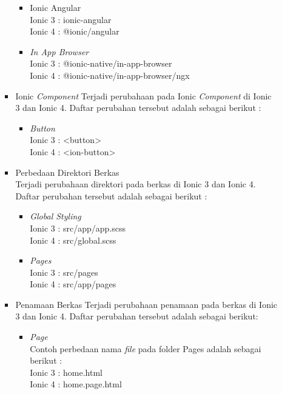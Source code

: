 \begin{enumerate}
\begin{enumerate}
\begin{itemize}
\begin{itemize}
				\item Ionic Angular \\
				Ionic 3 : ionic-angular  \\
				Ionic 4 : @ionic/angular
	
				\item {\it In App Browser} \\
				Ionic 3 : @ionic-native/in-app-browser \\
				Ionic 4 : @ionic-native/in-app-browser/ngx
			\end{itemize}
	
			\item Ionic {\it Component}
			Terjadi perubahaan pada Ionic {\it Component} di Ionic 3 dan Ionic 4. Daftar perubahan tersebut adalah sebagai berikut :
			\begin{itemize}
				\item {\it Button} \\
				Ionic 3 : <button>  \\
				Ionic 4 : <ion-button>
			\end{itemize}
	
			\item Perbedaan Direktori Berkas \\
			Terjadi perubahaan direktori pada berkas di Ionic 3 dan Ionic 4. Daftar perubahan tersebut adalah sebagai berikut :
			\begin{itemize}
				\item {\it Global Styling} \\
				Ionic 3 : src/app/app.scss \\
				Ionic 4 : src/global.scss

				\item {\it Pages} \\
				Ionic 3 : src/pages  \\
				Ionic 4 : src/app/pages
			\end{itemize}
	
			\item Penamaan Berkas
			Terjadi perubahaan penamaan pada berkas di Ionic 3 dan Ionic 4. Daftar perubahan tersebut adalah sebagai berikut:
			\begin{itemize}
				\item {\it Page} \\
				Contoh perbedaan nama {\it file} pada folder Pages adalah sebagai berikut :\\
				Ionic 3 : home.html  \\
				Ionic 4 : home.page.html
	

\end{itemize}
\end{itemize}
\end{enumerate}
\end{enumerate}
